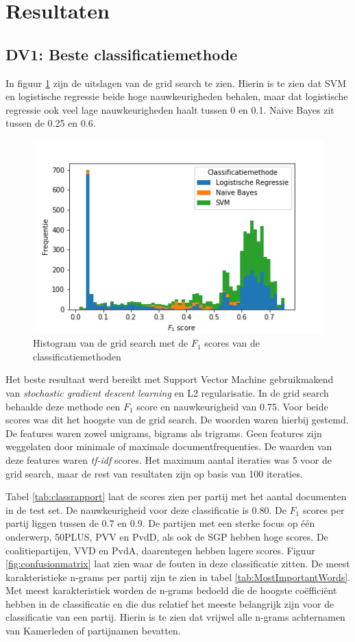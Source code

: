 
\section{Resultaten}

\subsection{DV1: Beste classificatiemethode}
In figuur \ref{fig:scores} zijn de uitslagen van de grid search te zien. Hierin is te zien dat SVM en logistische regressie beide hoge nauwkeurigheden behalen, maar dat logistische regressie ook veel lage nauwkeurigheden haalt tussen 0 en 0.1. Naive Bayes zit tussen de 0.25 en 0.6.
\begin{figure}[H]
  \centering
    \includegraphics[width=0.50\paperwidth]{Verslag/Tables/scores.png}
\caption{Histogram van de grid search met de $F_1$ scores van de classificatiemethoden}
\label{fig:scores}
\end{figure}
Het beste resultaat werd bereikt met Support Vector Machine gebruikmakend van \textit{stochastic gradient descent learning} en L2 regularisatie. In de grid search behaalde deze methode een $F_1$ score en nauwkeurigheid van 0.75. Voor beide scores was dit het hoogste van de grid search. De woorden waren hierbij gestemd. De features waren zowel unigrams, bigrams als trigrams. Geen features zijn weggelaten door minimale of maximale documentfrequenties. De waarden van deze features waren \textit{tf-idf} scores. Het maximum aantal iteraties was 5 voor de grid search, maar de rest van resultaten zijn op basis van 100 iteraties.\par
Tabel \ref{tab:classrapport} laat de scores zien per partij met het aantal documenten in de test set. De nauwkeurigheid voor deze classificatie is 0.80. De $F_1$ scores per partij liggen tussen de 0.7 en 0.9. De partijen met een sterke focus op één onderwerp, 50PLUS, PVV en PvdD, als ook de SGP hebben hoge scores. De coalitiepartijen, VVD en PvdA, daarentegen hebben lagere scores. Figuur \ref{fig:confusionmatrix} laat zien waar de fouten in deze classificatie zitten. De meest karakteristieke n-grams per partij zijn te zien in tabel \ref{tab:MostImportantWords}. Met meest karakteristiek worden de n-grams bedoeld die de hoogste coëfficiënt hebben in de classificatie en die dus relatief het meeste belangrijk zijn voor de classificatie van een partij. Hierin is te zien dat vrijwel alle n-grams achternamen van Kamerleden of partijnamen bevatten.\par

